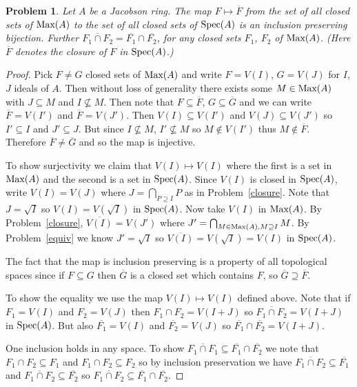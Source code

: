 \documentclass{article}
\newcommand{\spec}{\textup{Spec}}
\newcommand{\Max}{\textup{Max}}
\newtheorem{problem}{Problem}
\begin{document}
\begin{problem}
Let $A$ be a Jacobson ring. The map $F \mapsto \overline{F}$ from the set of all closed sets of $\Max(A)$ to the set of all closed sets of $\spec(A)$ is an inclusion preserving bijection. Further $\overline{F_1 \cap F_2} = \overline{F_1} \cap \overline{F_2}$, for any closed sets $F_1$, $F_2$ of $\Max(A)$. (Here $\overline{F}$ denotes the closure of $F$ in $\spec(A)$.)
\end{problem}
\begin{proof}
Pick $F \neq G$ closed sets of $\Max(A)$ and write $F = V(I)$, $G = V(J)$ for $I$, $J$ ideals of $A$. Then without loss of generality there exists some $M \in \Max(A)$ with $J \subseteq M$ and $I \nsubseteq M$. Then note that $F \subseteq \overline{F}$, $G \subseteq \overline{G}$ and we can write $\overline{F} = V(I')$ and $\overline{F} = V(J')$. Then $V(I) \subseteq V(I')$ and $V(J) \subseteq V(J')$ so $I' \subseteq I$ and $J' \subseteq J$. But since $I \nsubseteq M$, $I' \nsubseteq M$ so $M \notin V(I')$ thus $M \notin \overline{F}$. Therefore $\overline{F} \neq \overline{G}$ and so the map is injective.

To show surjectivity we claim that $V(I) \mapsto V(I)$ where the first is a set in $\Max(A)$ and the second is a set in $\spec(A)$. Since $V(I)$ is closed in $\spec(A)$, write $V(I) = V(J)$ where $J = \bigcap_{P \supseteq I} P$ as in Problem~\ref{closure}. Note that $J = \sqrt{I}$ so $V(I) = V(\sqrt{I})$ in $\spec(A)$. Now take $V(I)$ in $\Max(A)$. By Problem~\ref{closure}, $\overline{V(I)} = V(J')$ where $J' = \bigcap_{M \in \Max(A), M \supseteq I} M$. By Problem~\ref{equiv} we know $J' = \sqrt{I}$ so $\overline{V(I)} = V(\sqrt{I}) = V(I)$ in $\spec(A)$.

The fact that the map is inclusion preserving is a property of all topological spaces since if $F \subseteq G$ then $\overline{G}$ is a closed set which contains $F$, so $\overline{G} \supseteq \overline{F}$.

To show the equality we use the map $V(I) \mapsto V(I)$ defined above. Note that if $F_1 = V(I)$ and $F_2 = V(J)$ then $F_1 \cap F_2 = V(I + J)$ so $\overline{F_1 \cap F_2} = V(I + J)$ in $\spec(A)$. But also $\overline{F_1} = V(I)$ and $\overline{F_2} = V(J)$ so $\overline{F_1} \cap \overline{F_2} = V(I + J)$.

One inclusion holds in any space. To show $\overline{F_1 \cap F_1} \subseteq \overline{F_1} \cap \overline{F_2}$ we note that $F_1 \cap F_2 \subseteq F_1$ and $F_1 \cap F_2 \subseteq F_2$ so by inclusion preservation we have $\overline{F_1 \cap F_2} \subseteq \overline{F_1}$ and $\overline{F_1 \cap F_2} \subseteq \overline{F_2}$ so $\overline{F_1 \cap F_2} \subseteq \overline{F_1} \cap \overline{F_2}$.
\end{proof}
\end{document}
